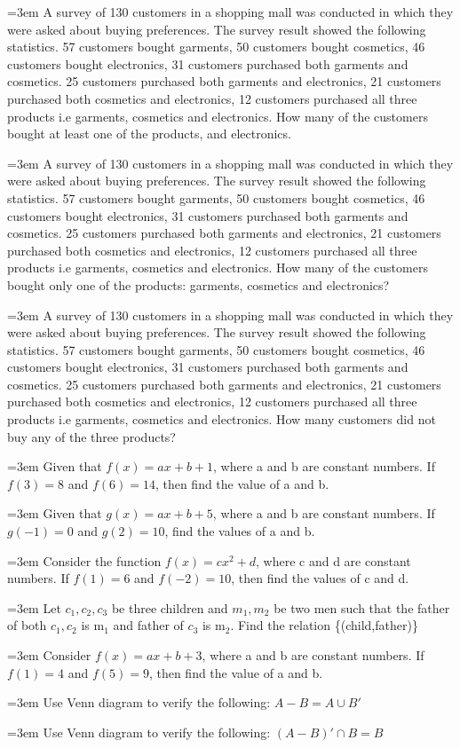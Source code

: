 \documentclass[11pt,a4paper]{article}
\newcommand{\lqn}[2]{\par\medskip\noindent\hangindent=3em\hangafter=1
  \makebox[3em][l]{\textbf{#1.}}#2\par}
\begin{document}
\lqn{85}{A survey of 130 customers in a shopping mall was conducted in which they were asked about buying preferences. The survey result showed the following statistics. 57 customers bought garments, 50 customers bought cosmetics, 46 customers bought electronics, 31 customers purchased both garments and cosmetics. 25 customers purchased both garments and electronics, 21 customers purchased both cosmetics and electronics, 12 customers purchased all three products i.e garments, cosmetics and electronics. How many of the customers bought at least one of the products, and electronics.}
\lqn{86}{A survey of 130 customers in a shopping mall was conducted in which they were asked about buying preferences. The survey result showed the following statistics. 57 customers bought garments, 50 customers bought cosmetics, 46 customers bought electronics, 31 customers purchased both garments and cosmetics. 25 customers purchased both garments and electronics, 21 customers purchased both cosmetics and electronics, 12 customers purchased all three products i.e garments, cosmetics and electronics. How many of the customers bought only one of the products: garments, cosmetics and electronics?}
\lqn{87}{A survey of 130 customers in a shopping mall was conducted in which they were asked about buying preferences. The survey result showed the following statistics. 57 customers bought garments, 50 customers bought cosmetics, 46 customers bought electronics, 31 customers purchased both garments and cosmetics. 25 customers purchased both garments and electronics, 21 customers purchased both cosmetics and electronics, 12 customers purchased all three products i.e garments, cosmetics and electronics. How many customers did not buy any of the three products?}
\lqn{88}{Given that $f(x)=ax+b+1$, where a and b are constant numbers. If $f(3)=8$ and $f(6)=14$, then find the value of a and b.}
\lqn{89}{Given that $g(x)=ax+b+5$, where a and b are constant numbers. If $g(-1)=0$ and $g(2)=10$, find the values of a and b.}
\lqn{90}{Consider the function $f(x)=cx^{2}+d$, where c and d are constant numbers. If $f(1)=6$ and $f(-2)=10$, then find the values of c and d.}
\lqn{91}{Let $c_{1},c_{2},c_{3}$ be three children and $m_{1},m_{2}$ be two men such that the father of both $c_{1},c_{2}$ is m$_{1}$ and father of $c_{3}$ is m$_{2}$. Find the relation \{(child,father)\}}
\lqn{92}{Consider $f(x)=ax+b+3$, where a and b are constant numbers. If $f(1)=4$ and $f(5)=9$, then find the value of a and b.}
\lqn{93}{Use Venn diagram to verify the following: $A-B=A\cup B'$}
\lqn{94}{Use Venn diagram to verify the following: $(A-B)'\cap B=B$}
\end{document}
